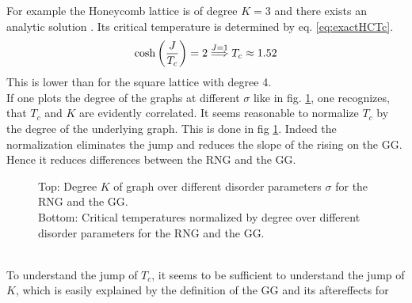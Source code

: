     For example the Honeycomb lattice is of degree \(K=3\)
    and there exists an analytic solution \cite{Wannier1945}.
    Its critical temperature is determined by eq. \eqref{eq:exactHCTc}.
    \begin{equation}
        \cosh\left(\frac{J}{T_c}\right)=2 \overset{J=1}{\Longrightarrow} T_c \approx 1.52
        \label{eq:exactHCTc}
    \end{equation}
    This is lower than for the square lattice with degree 4.\\
    If one plots the degree of the graphs at different \(\sigma\) like
    in fig. \ref{fig:Tc_deg},
    one recognizes, that \(T_c\) and \(K\) are evidently correlated.
    It seems reasonable to normalize \(T_c\) by the degree of the underlying
    graph. This is done in fig \ref{fig:Tc_deg}.
    Indeed the normalization eliminates the jump and reduces the
    slope of the rising on the GG. Hence it reduces differences
    between the RNG and the GG.
    \begin{figure}[htbp]
        \centering


        \caption[Critical Temperature normalized by Degree of the Graph]
        {
            Top: Degree \(K\) of graph over different
            disorder parameters \(\sigma\) for
             the RNG and
             the GG.\\
            Bottom: Critical temperatures normalized by degree over different
            disorder parameters for
             the RNG and
             the GG.
        }
        \label{fig:Tc_deg}
    \end{figure}\\
    To understand the jump of \(T_c\), it seems to be sufficient to
    understand the jump of \(K\), which is easily explained
    by the definition of the GG and its aftereffects for
